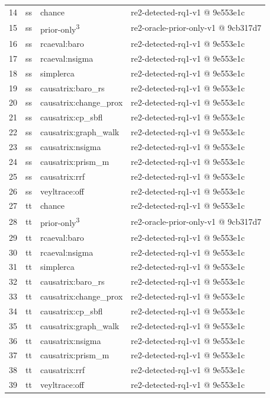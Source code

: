 \begin{longtable}{@{}r>{\raggedright\arraybackslash}p{18.0pt}>{\raggedright\arraybackslash}p{63.0pt}>{\raggedright\arraybackslash}p{105.0pt}@{}}
14 & ss & chance & re2-detected-rq1-v1 @ 9e553e1c \\
15 & ss & prior-only\textsuperscript{3} & re2-oracle-prior-only-v1 @ 9cb317d7 \\
16 & ss & rcaeval:baro & re2-detected-rq1-v1 @ 9e553e1c \\
17 & ss & rcaeval:nsigma & re2-detected-rq1-v1 @ 9e553e1c \\
18 & ss & simplerca & re2-detected-rq1-v1 @ 9e553e1c \\
19 & ss & causatrix:baro\_rs & re2-detected-rq1-v1 @ 9e553e1c \\
20 & ss & causatrix:change\_prox & re2-detected-rq1-v1 @ 9e553e1c \\
21 & ss & causatrix:cp\_sbfl & re2-detected-rq1-v1 @ 9e553e1c \\
22 & ss & causatrix:graph\_walk & re2-detected-rq1-v1 @ 9e553e1c \\
23 & ss & causatrix:nsigma & re2-detected-rq1-v1 @ 9e553e1c \\
24 & ss & causatrix:prism\_m & re2-detected-rq1-v1 @ 9e553e1c \\
25 & ss & causatrix:rrf & re2-detected-rq1-v1 @ 9e553e1c \\
26 & ss & veyltrace:off & re2-detected-rq1-v1 @ 9e553e1c \\
27 & tt & chance & re2-detected-rq1-v1 @ 9e553e1c \\
28 & tt & prior-only\textsuperscript{3} & re2-oracle-prior-only-v1 @ 9cb317d7 \\
29 & tt & rcaeval:baro & re2-detected-rq1-v1 @ 9e553e1c \\
30 & tt & rcaeval:nsigma & re2-detected-rq1-v1 @ 9e553e1c \\
31 & tt & simplerca & re2-detected-rq1-v1 @ 9e553e1c \\
32 & tt & causatrix:baro\_rs & re2-detected-rq1-v1 @ 9e553e1c \\
33 & tt & causatrix:change\_prox & re2-detected-rq1-v1 @ 9e553e1c \\
34 & tt & causatrix:cp\_sbfl & re2-detected-rq1-v1 @ 9e553e1c \\
35 & tt & causatrix:graph\_walk & re2-detected-rq1-v1 @ 9e553e1c \\
36 & tt & causatrix:nsigma & re2-detected-rq1-v1 @ 9e553e1c \\
37 & tt & causatrix:prism\_m & re2-detected-rq1-v1 @ 9e553e1c \\
38 & tt & causatrix:rrf & re2-detected-rq1-v1 @ 9e553e1c \\
39 & tt & veyltrace:off & re2-detected-rq1-v1 @ 9e553e1c \\

\end{longtable}
